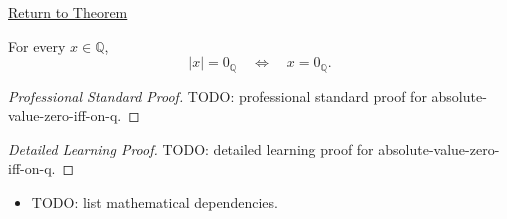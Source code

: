 \newpage
{}
\label{prf:absolute-value-zero-iff-on-q}

\begin{remark*}[Return]
\hyperref[thm:absolute-value-zero-iff-on-q]{Return to Theorem}
\end{remark*}

\begin{theorem*}
For every $x\in\mathbb{Q}$,
\[
|x|=0_{\mathbb{Q}}
\quad\Longleftrightarrow\quad
x=0_{\mathbb{Q}}.
\]
\end{theorem*}

\begin{proof}[Professional Standard Proof]
\LRAProofBodyStart
TODO: professional standard proof for absolute-value-zero-iff-on-q.
\end{proof}

\begin{proof}[Detailed Learning Proof]
\LRAProofBodyStart
TODO: detailed learning proof for absolute-value-zero-iff-on-q.
\end{proof}

\begin{remark*}
\end{remark*}

\begin{dependencies}
\begin{itemize}
  \item TODO: list mathematical dependencies.
\end{itemize}
\end{dependencies}

\clearpage
